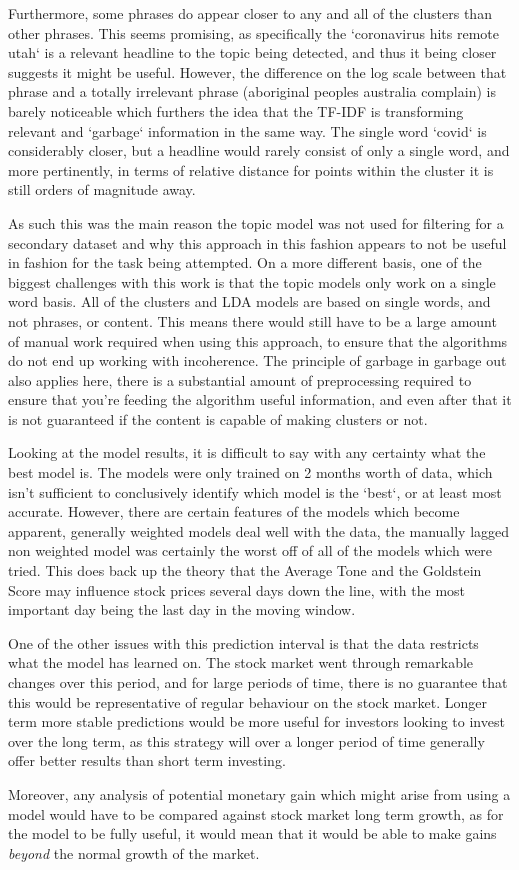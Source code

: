 Furthermore, some phrases do appear closer to any and all of the clusters than other phrases. This seems promising, as specifically the `coronavirus hits remote utah` is a relevant headline to the topic being detected, and thus it being closer suggests it might be useful. However, the difference on the log scale between that phrase and a totally irrelevant phrase (aboriginal peoples australia complain) is barely noticeable which furthers the idea that the TF-IDF is transforming relevant and `garbage` information in the same way. The single word `covid` is considerably closer, but a headline would rarely consist of only a single word, and more pertinently, in terms of relative distance for points within the cluster it is still orders of magnitude away. 

As such this was the main reason the topic model was not used for filtering for a secondary dataset and why this approach in this fashion appears to not be useful in fashion for the task being attempted. On a more different basis, one of the biggest challenges with this work is that the topic models only work on a single word basis. All of the clusters and LDA models are based on single words, and not phrases, or content. This means there would still have to be a large amount of manual work required when using this approach, to ensure that the algorithms do not end up working with incoherence. The principle of garbage in garbage out also applies here, there is a substantial amount of preprocessing required to ensure that you're feeding the algorithm useful information, and even after that it is not guaranteed if the content is capable of making clusters or not.


Looking at the model results, it is difficult to say with any certainty what the best model is. The models were only trained on 2 months worth of data, which isn't sufficient to conclusively identify which model is the `best`, or at least most accurate. However, there are certain features of the models which become apparent, generally weighted models deal well with the data, the manually lagged non weighted model was certainly the worst off of all of the models which were tried. This does back up the theory that the Average Tone and the Goldstein Score may influence stock prices several days down the line, with the most important day being the last day in the moving window.

One of the other issues with this prediction interval is that the data restricts what the model has learned on. The stock market went through remarkable changes over this period, and for large periods of time, there is no guarantee that this would be representative of regular behaviour on the stock market. Longer term more stable predictions would be more useful for investors looking to invest over the long term, as this strategy will over a longer period of time generally offer better results than short term investing.

Moreover, any analysis of potential monetary gain which might arise from using a model would have to be compared against stock market long term growth, as for the model to be fully useful, it would mean that it would be able to make gains \textit{beyond} the normal growth of the market.





